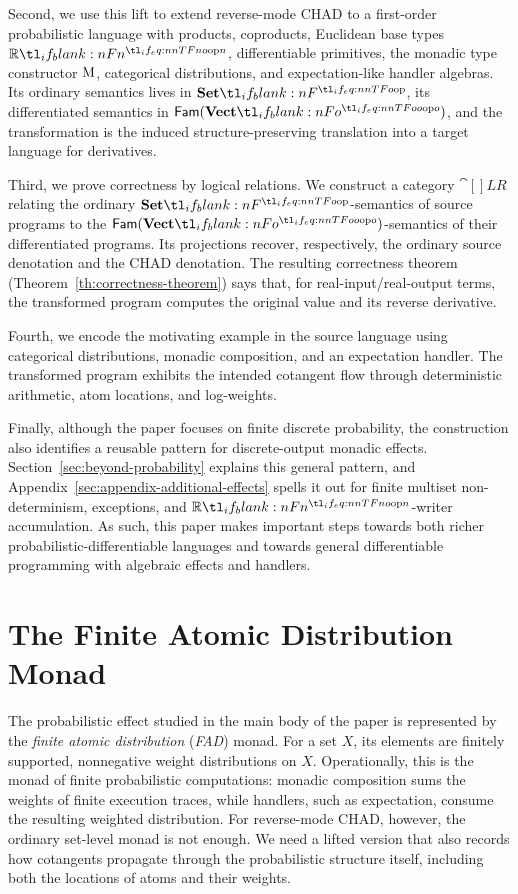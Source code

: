 \documentclass[11pt,a4paper]{article}
\theoremstyle{definition}
\theoremstyle{remark}
\providecommand{\Fam}[1]{\mathsf{Fam}(#1)}
\begin{document}
Second, we use this lift to extend reverse-mode CHAD to a first-order
probabilistic language with products, coproducts, Euclidean base types
\(\R[n]\), differentiable primitives, the monadic type constructor
\(\opn[b]{M}\), categorical distributions, and expectation-like handler
algebras. Its ordinary semantics lives in \( \Set \), its differentiated
semantics in \( \Fam{\Vect[o]} \), and the transformation is the induced
structure-preserving translation into a target language for derivatives.

Third, we prove correctness by logical relations. We construct a category
\(\cat[]{LR}\) relating the ordinary \( \Set \)-semantics of source programs to
the \( \Fam{\Vect[o]} \)-semantics of their differentiated programs. Its
projections recover, respectively, the ordinary source denotation and the CHAD
denotation. The resulting correctness theorem
(Theorem~\ref{th:correctness-theorem}) says that, for real-input/real-output
terms, the transformed program computes the original value and its reverse
derivative.

Fourth, we encode the motivating example in the source language using
categorical distributions, monadic composition, and an expectation handler. The
transformed program exhibits the intended cotangent flow through deterministic
arithmetic, atom locations, and log-weights.

Finally, although the paper focuses on finite discrete probability, the
construction also identifies a reusable pattern for discrete-output monadic
effects. Section~\ref{sec:beyond-probability} explains this general pattern,
and Appendix~\ref{sec:appendix-additional-effects} spells it out for finite
multiset non-determinism, exceptions, and \( \R[n] \)-writer accumulation.
As such, this paper makes important steps
towards both richer probabilistic-differentiable languages and towards general differentiable programming with algebraic effects and handlers.


\section{The Finite Atomic Distribution Monad}

The probabilistic effect studied in the main body of the paper is represented
by the \emph{finite atomic distribution} (\emph{FAD}) monad. For a set \(X\),
its elements are finitely supported, nonnegative weight distributions on \(X\).
Operationally, this is the monad of finite probabilistic computations: monadic
composition sums the weights of finite execution traces, while handlers, such
as expectation, consume the resulting weighted distribution. For reverse-mode
CHAD, however, the ordinary set-level monad is not enough. We need a lifted
version that also records how cotangents propagate through the probabilistic
structure itself, including both the locations of atoms and their weights.
\end{document}
